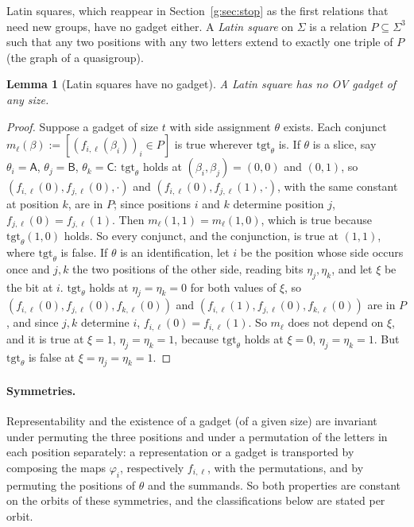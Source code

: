 \documentclass[11pt]{article}
\newtheorem{lemma}[theorem]{Lemma}
\theoremstyle{definition}
\theoremstyle{remark}
\begin{document}
Latin squares, which reappear in Section~\ref{g:sec:stop} as the first relations that need new groups, have no gadget either. A \emph{Latin square} on $\Sigma$ is a relation $P\subseteq\Sigma^3$ such that any two positions with any two letters extend to exactly one triple of $P$ (the graph of a quasigroup).

\begin{lemma}[Latin squares have no gadget]\label{g:lem:latinnogadget}
A Latin square has no OV gadget of any size.
\end{lemma}
\begin{proof}
Suppose a gadget of size $t$ with side assignment $\theta$ exists. Each conjunct $m_\ell(\beta):=[(f_{i,\ell}(\beta_i))_i\in P]$ is true wherever $\mathrm{tgt}_\theta$ is. If $\theta$ is a slice, say $\theta_i=\mathsf A$, $\theta_j=\mathsf B$, $\theta_k=\mathsf C$: $\mathrm{tgt}_\theta$ holds at $(\beta_i,\beta_j)=(0,0)$ and $(0,1)$, so $(f_{i,\ell}(0),f_{j,\ell}(0),\cdot)$ and $(f_{i,\ell}(0),f_{j,\ell}(1),\cdot)$, with the same constant at position $k$, are in $P$; since positions $i$ and $k$ determine position $j$, $f_{j,\ell}(0)=f_{j,\ell}(1)$. Then $m_\ell(1,1)=m_\ell(1,0)$, which is true because $\mathrm{tgt}_\theta(1,0)$ holds. So every conjunct, and the conjunction, is true at $(1,1)$, where $\mathrm{tgt}_\theta$ is false. If $\theta$ is an identification, let $i$ be the position whose side occurs once and $j,k$ the two positions of the other side, reading bits $\eta_j,\eta_k$, and let $\xi$ be the bit at $i$. $\mathrm{tgt}_\theta$ holds at $\eta_j=\eta_k=0$ for both values of $\xi$, so $(f_{i,\ell}(0),f_{j,\ell}(0),f_{k,\ell}(0))$ and $(f_{i,\ell}(1),f_{j,\ell}(0),f_{k,\ell}(0))$ are in $P$, and since $j,k$ determine $i$, $f_{i,\ell}(0)=f_{i,\ell}(1)$. So $m_\ell$ does not depend on $\xi$, and it is true at $\xi=1$, $\eta_j=\eta_k=1$, because $\mathrm{tgt}_\theta$ holds at $\xi=0$, $\eta_j=\eta_k=1$. But $\mathrm{tgt}_\theta$ is false at $\xi=\eta_j=\eta_k=1$.
\end{proof}

\paragraph{Symmetries.} Representability and the existence of a gadget (of a given size) are invariant under permuting the three positions and under a permutation of the letters in each position separately: a representation or a gadget is transported by composing the maps $\varphi_i$, respectively $f_{i,\ell}$, with the permutations, and by permuting the positions of $\theta$ and the summands. So both properties are constant on the orbits of these symmetries, and the classifications below are stated per orbit.
\end{document}
